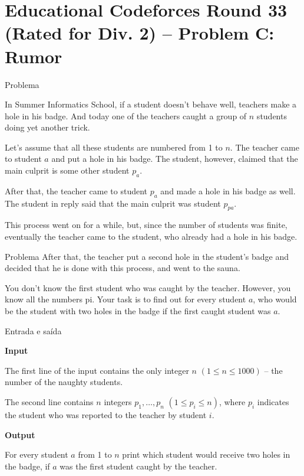 \section{Educational Codeforces Round 33 (Rated for Div. 2) -- Problem C: Rumor}

\begin{frame}[fragile]{Problema}

In Summer Informatics School, if a student doesn't behave well, teachers make a hole in his badge. 
And today one of the teachers caught a group of $n$ students doing yet another trick.

Let's assume that all these students are numbered from 1 to $n$. The teacher came to student $a$ 
and put a hole in his badge. The student, however, claimed that the main culprit is some other 
student $p_a$.

After that, the teacher came to student $p_a$ and made a hole in his badge as well. The student in 
reply said that the main culprit was student $p_{pa}$.

This process went on for a while, but, since the number of students was finite, eventually the teacher came to the student, who already had a hole in his badge.
\end{frame}

\begin{frame}[fragile]{Problema}
After that, the teacher put a second hole in the student's badge and decided that he is done with this process, and went to the sauna.

You don't know the first student who was caught by the teacher. However, you know all the numbers pi. Your task is to find out for every student $a$, who would be the student with two holes in the badge if the first caught student was $a$.
\end{frame}

\begin{frame}[fragile]{Entrada e saída}

\textbf{Input}

The first line of the input contains the only integer $n$ $(1\leq n\leq 1000)$ -- the number of the naughty students.

The second line contains $n$ integers $p_1, \ldots, p_n$ $(1\leq p_i\leq n)$, where $p_i$ indicates 
the student who was reported to the teacher by student $i$.

\textbf{Output}

For every student $a$ from 1 to $n$ print which student would receive two holes in the badge, if $a$ was the first student caught by the teacher.

\end{frame}

